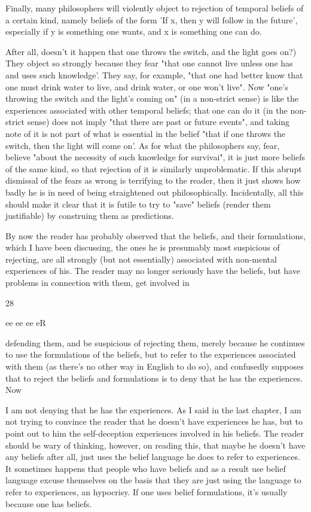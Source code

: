 \documentclass[10pt,twoside]{memoir}
\begin{document}
\begin{enumerate}
Finally, many philosophers will violently object to rejection of 
temporal beliefs of a certain kind, namely beliefs of the form 'If x, then y 
will follow in the future', especially if y is something one wants, and x is 
something one can do. {After all, doesn't it happen that one throws the 
switch, and the light goes on?) They object so strongly because they fear 
"that one cannot live unless one has and uses such knowledge'. They say, 
for example, "that one had better know that one must drink water to live, 
and drink water, or one won't live". Now "one's throwing the switch and the 
light's coming on" (in a non-strict sense) is like the experiences associated 
with other temporal beliefs; that one can do it (in the non-strict sense) does 
not imply "that there are past or future events", and taking note of it is not 
part of what is essential in the belief "that if one throws the switch, then the 
light will come on'. As for what the philosophers say, fear, believe "about 
the necessity of such knowledge for survivai", it is just more beliefs of the 
same kind, so that rejection of it is similarly unproblematic. If this abrupt 
dismissal of the fears as wrong is terrifying to the reader, then it just shows 
how badly he is in need of being straightened out philosophically. 
Incidentally, all this should make it clear that it is futile to try to "save" 
beliefs (render them justifiable) by construing them as predictions. 

By now the reader has probably observed that the beliefs, and their 
formulations, which I have been discussing, the ones he is presumably most 
suspicious of rejecting, are all strongly (but not essentially) associated with 
non-mental experiences of his. The reader may no longer seriously have the 
beliefs, but have problems in connection with them, get involved in 


28 


ee ee ee eR 


defending them, and be suspicious of rejecting them, merely because he 
continues to use the formulations of the beliefs, but to refer to the 
experiences associated with them (as there's no other way in English to do 
so), and confusedly supposes that to reject the beliefs and formulations is to 
deny that he has the experiences. Now {I am not denying that he has the 
experiences. As I said in the last chapter, I am not trying to convince the 
reader that he doesn't have experiences he has, but to point out to him the 
self-deception experiences involved in his beliefs. The reader should be wary 
of thinking, however, on reading this, that maybe he doesn't have any beliefs 
after all, just uses the belief language he does to refer to experiences. It 
sometimes happens that people who have beliefs and as a result use belief 
language excuse themselves on the basis that they are just using the language 
to refer to experiences, an hypocrisy. If one uses belief formulations, it's 
usually because one has beliefs. 

}}
\end{enumerate}
\end{document}
